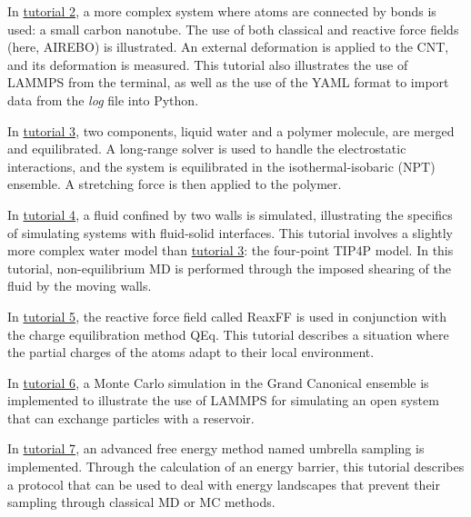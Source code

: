 \documentclass[9pt,tutorial]{livecoms}
\begin{document}
In \hyperref[carbon-nanotube-label]{tutorial 2}, a more complex system where atoms are connected by bonds is used: a small carbon nanotube. The use of both classical and reactive force fields (here, AIREBO) is illustrated. An external deformation is applied to the CNT, and its deformation is measured. This tutorial also illustrates the use of LAMMPS from the terminal, as well as the use of the YAML format to import data from the \textit{log} file into Python.

In \hyperref[all-atoms-label]{tutorial 3}, two components, liquid water and a polymer molecule, are merged and equilibrated. A long-range solver is used to handle the electrostatic interactions, and the system is equilibrated in the isothermal-isobaric (NPT) ensemble. A stretching force is then applied to the polymer.

In \hyperref[sheared-confined-label]{tutorial 4}, a fluid confined by two walls is simulated, illustrating the specifics of simulating systems with fluid-solid interfaces. This tutorial involves a slightly more complex water model than \hyperref[all-atoms-label]{tutorial 3}: the four-point TIP4P model. In this tutorial, non-equilibrium MD is performed through the imposed shearing of the fluid by the moving walls.

In \hyperref[reactive-silicon-dioxide-label]{tutorial 5}, the reactive force field called ReaxFF is used in conjunction with the charge equilibration method QEq. This tutorial describes a situation where the partial charges of the atoms adapt to their local environment.

In \hyperref[gcmc-silica-label]{tutorial 6}, a Monte Carlo simulation in the Grand Canonical ensemble is implemented to illustrate the use of LAMMPS for simulating an open system that can exchange particles with a reservoir.

In \hyperref[umbrella-sampling-label]{tutorial 7}, an advanced free energy method named umbrella sampling is implemented. Through the calculation of an energy barrier, this tutorial describes a protocol that can be used to deal with energy landscapes that prevent their sampling through classical MD or MC methods.
\end{document}
